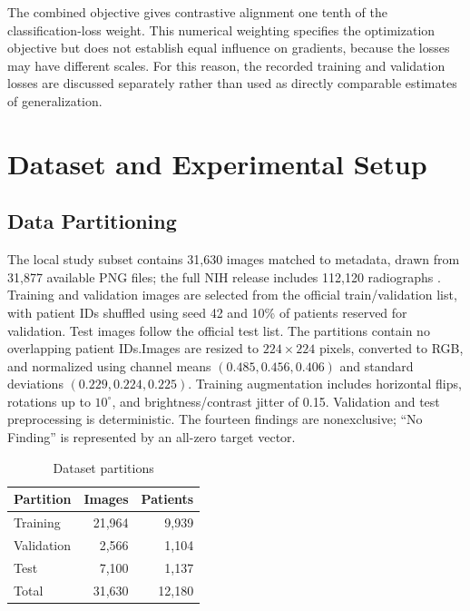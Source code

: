 \documentclass[conference,letterpaper]{IEEEtran}
\begin{document}
The combined objective gives contrastive alignment one tenth of the classification-loss weight. This numerical weighting specifies the optimization objective but does not establish equal influence on gradients, because the losses may have different scales. For this reason, the recorded training and validation losses are discussed separately rather than used as directly comparable estimates of generalization.

\section{Dataset and Experimental Setup}
\subsection{Data Partitioning}
The local study subset contains 31,630 images matched to metadata, drawn from 31,877 available PNG files; the full NIH release includes 112,120 radiographs \cite{nihdataset}. Training and validation images are selected from the official train/validation list, with patient IDs shuffled using seed 42 and 10\% of patients reserved for validation. Test images follow the official test list. The partitions contain no overlapping patient IDs.\linebreak\hspace*{3.989pt}Images are resized to $224\times224$ pixels, converted to RGB, and normalized using channel means $(0.485,0.456,0.406)$ and standard deviations $(0.229,0.224,0.225)$. Training augmentation includes horizontal flips, rotations up to $10^\circ$, and brightness/contrast jitter of 0.15. Validation and test preprocessing is deterministic. The fourteen findings are nonexclusive; ``No Finding'' is represented by an all-zero target vector.

\begin{table}[t]
\caption{Dataset partitions}\label{tab:split}
\centering\footnotesize
\begin{tabular}{lrr}\toprule
Partition & Images & Patients\\\midrule
Training & 21,964 & 9,939\\
Validation & 2,566 & 1,104\\
Test & 7,100 & 1,137\\\midrule
Total & 31,630 & 12,180\\\bottomrule
\end{tabular}
\end{table}
\end{document}
